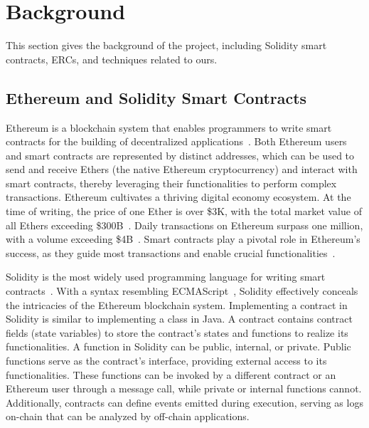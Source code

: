 \section{Background}
This section gives the background of the project, including 
Solidity smart contracts, 
ERCs, 
and techniques related to ours. 



\subsection{Ethereum and Solidity Smart Contracts}

Ethereum is a blockchain system that enables programmers to 
write smart contracts for the building 
of decentralized applications~\cite{eth-1,eth-2}. 
Both Ethereum users and smart contracts are represented by 
distinct addresses, which can be used to send and receive Ethers 
(the native Ethereum cryptocurrency) and interact with smart contracts, 
thereby leveraging their functionalities to perform complex transactions. 
Ethereum cultivates a thriving digital economy ecosystem. 
At the time of writing, the price of one Ether is over \$3K, 
with the total market value of all Ethers exceeding \$300B~\cite{eth-price}. 
Daily transactions on Ethereum surpass one million, 
with a volume exceeding \$4B~\cite{eth-daily}. 
Smart contracts play a pivotal role in Ethereum's success, as they guide 
most transactions and enable crucial 
functionalities~\cite{erc20,erc721,eth-defi}.



 
Solidity is the most widely used programming language
for writing smart contracts~\cite{solidity-popular-1,solidity-popular-2}. 
With a syntax resembling ECMAScript~\cite{ecmascript}, Solidity effectively conceals 
the intricacies of the Ethereum blockchain system. 
Implementing a contract in Solidity is similar to implementing 
a class in Java. A contract contains 
contract fields (state variables) to store the contract's states 
and functions to realize its functionalities. 
A function in Solidity can be public, internal, or private. 
Public functions serve as the contract's interface, providing external access 
to its functionalities. These functions can be invoked by a different contract 
or an Ethereum user through a message call, 
while private or internal functions cannot. 
Additionally, contracts can define events emitted during execution, 
serving as logs on-chain 
that can be analyzed by off-chain applications. 


